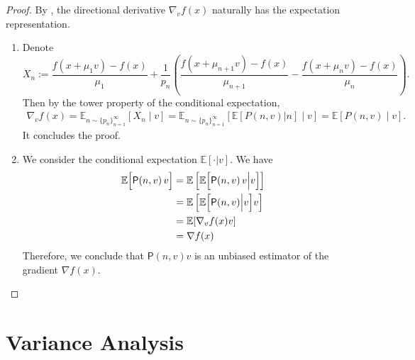 \documentclass{article}
\newcommand{\EE}{\mathbb{E}}
\theoremstyle{definition}
\theoremstyle{plain}
\theoremstyle{remark}
\begin{document}
\begin{proof} By , the directional derivative  $\nabla_v f(x)$ naturally has the expectation representation. 
\begin{enumerate}[label=(\alph*)]
    \item Denote
    $$X_n:=\frac{f(x+\mu_1 v) - f(x)}{\mu_1} + \frac{1}{p_n}\left( \frac{f(x+\mu_{n+1} v) - f(x)}{\mu_{n+1}} - \frac{f(x+\mu_n v) - f(x)}{\mu_n}\right).$$
    Then by the tower property of the conditional expectation,
    \begin{align*}
        \nabla_v f(x) =\EE_{n\sim  \{ p_n\}_{n=1}^\infty}[X_n\mid v]  = \EE_{n\sim  \{ p_n\}_{n=1}^\infty}[ \EE[ P(n,v)| n] \mid v] = \EE[P(n,v)\mid v].
    \end{align*}
    It concludes the proof. 

    \item We consider the conditional expectation $\EE[\cdot|v]$. We have
    \begin{align*}
        \EE\Bigl[\mathsf{P}(n,v)\,v\Bigr] &= \EE \left[ \EE\Bigl[\mathsf{P}(n,v)\,v \Big| v \Bigr]  \right]\\ 
        &=\EE \left[ \EE\Bigl[\mathsf{P}(n,v) \Big| v \Bigr] v  \right] \\ 
        &= \EE[ \nabla_v f(x) v] \\ 
        &= \nabla f(x) 
    \end{align*}
    Therefore, we conclude that $\mathsf{P}(n,v) v$ is an unbiased estimator of the gradient $\nabla f(x)$.  
\end{enumerate}
\end{proof} 
    

\section{Variance Analysis}\label{appendix:variance} 
\end{document}
